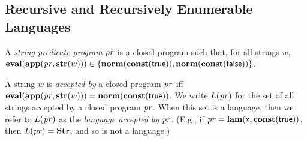 %

\subsection{Recursive and Recursively Enumerable Languages}

%
%
A \emph{string predicate program} $\mathit{pr}$ is a closed program such that, for
all strings $w$, $\mathbf{eval}(\mathbf{app}(\mathit{pr},\mathbf{str}(w)))\in
\{\mathbf{norm}(\mathbf{const}(\mathsf{true})),\mathbf{norm}(\mathbf{const}(\mathsf{false}))\}$.

%
A string $w$ is \emph{accepted by} a closed program $\mathit{pr}$ iff
$\mathbf{eval}(\mathbf{app}(\mathit{pr},\mathbf{str}(w))) = \mathbf{norm}(\mathbf{const}(\mathsf{true}))$.
We write $L(\mathit{pr})$ for the set of all strings accepted by a closed
program $\mathit{pr}$.  When this set is a language, then we refer to $L(\mathit{pr})$
as the \emph{language accepted by} $\mathit{pr}$.  (E.g., if
%
%
%
$\mathit{pr}=\mathbf{lam}(\mathsf{x},\mathbf{const}(\mathsf{true}))$, then $L(\mathit{pr}) =
\mathbf{Str}$, and so is not a language.)

